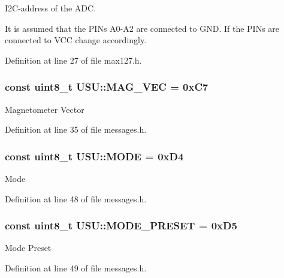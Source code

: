 \-I2\-C-\/address of the \-A\-D\-C. 

\-It is assumed that the \-P\-I\-Ns \-A0-\/\-A2 are connected to \-G\-N\-D. \-If the \-P\-I\-Ns are connected to \-V\-C\-C change accordingly. 

\-Definition at line 27 of file max127.\-h.

\hypertarget{namespace_u_s_u_a85ca84f12076e3251addb0c96317c83a}{
\subsubsection[{\-M\-A\-G\-\_\-\-V\-E\-C}]{\setlength{\rightskip}{0pt plus 5cm}const uint8\-\_\-t {\bf \-U\-S\-U\-::\-M\-A\-G\-\_\-\-V\-E\-C} = 0x\-C7}}\label{namespace_u_s_u_a85ca84f12076e3251addb0c96317c83a}
\-Magnetometer \-Vector 

\-Definition at line 35 of file messages.\-h.

\hypertarget{namespace_u_s_u_afb689aa4352de24daaa765fd9e625ae3}{
\subsubsection[{\-M\-O\-D\-E}]{\setlength{\rightskip}{0pt plus 5cm}const uint8\-\_\-t {\bf \-U\-S\-U\-::\-M\-O\-D\-E} = 0x\-D4}}\label{namespace_u_s_u_afb689aa4352de24daaa765fd9e625ae3}
\-Mode 

\-Definition at line 48 of file messages.\-h.

\hypertarget{namespace_u_s_u_afc9a1298a3210c69931db151aaf35de7}{
\subsubsection[{\-M\-O\-D\-E\-\_\-\-P\-R\-E\-S\-E\-T}]{\setlength{\rightskip}{0pt plus 5cm}const uint8\-\_\-t {\bf \-U\-S\-U\-::\-M\-O\-D\-E\-\_\-\-P\-R\-E\-S\-E\-T} = 0x\-D5}}\label{namespace_u_s_u_afc9a1298a3210c69931db151aaf35de7}
\-Mode \-Preset 

\-Definition at line 49 of file messages.\-h.

